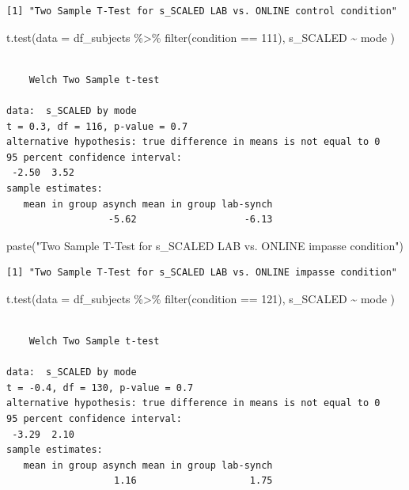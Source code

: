 \documentclass[
  letterpaper,
  DIV=11,
  numbers=noendperiod]{scrreprt}
\newenvironment{Shaded}{\begin{snugshade}}{\end{snugshade}}
\newcommand{\AttributeTok}[1]{\textcolor[rgb]{0.40,0.45,0.13}{#1}}
\newcommand{\DecValTok}[1]{\textcolor[rgb]{0.68,0.00,0.00}{#1}}
\newcommand{\FunctionTok}[1]{\textcolor[rgb]{0.28,0.35,0.67}{#1}}
\newcommand{\NormalTok}[1]{\textcolor[rgb]{0.00,0.23,0.31}{#1}}
\newcommand{\SpecialCharTok}[1]{\textcolor[rgb]{0.37,0.37,0.37}{#1}}
\newcommand{\StringTok}[1]{\textcolor[rgb]{0.13,0.47,0.30}{#1}}
\begin{document}
\begin{verbatim}
[1] "Two Sample T-Test for s_SCALED LAB vs. ONLINE control condition"
\end{verbatim}

\begin{Shaded}
\begin{Highlighting}[]
\FunctionTok{t.test}\NormalTok{(}\AttributeTok{data =}\NormalTok{ df\_subjects }\SpecialCharTok{\%\textgreater{}\%} \FunctionTok{filter}\NormalTok{(condition }\SpecialCharTok{==} \DecValTok{111}\NormalTok{), s\_SCALED }\SpecialCharTok{\textasciitilde{}}\NormalTok{ mode )}
\end{Highlighting}
\end{Shaded}

\begin{verbatim}

    Welch Two Sample t-test

data:  s_SCALED by mode
t = 0.3, df = 116, p-value = 0.7
alternative hypothesis: true difference in means is not equal to 0
95 percent confidence interval:
 -2.50  3.52
sample estimates:
   mean in group asynch mean in group lab-synch 
                  -5.62                   -6.13 
\end{verbatim}

\begin{Shaded}
\begin{Highlighting}[]
\FunctionTok{paste}\NormalTok{(}\StringTok{"Two Sample T{-}Test for s\_SCALED LAB vs. ONLINE impasse condition"}\NormalTok{)}
\end{Highlighting}
\end{Shaded}

\begin{verbatim}
[1] "Two Sample T-Test for s_SCALED LAB vs. ONLINE impasse condition"
\end{verbatim}

\begin{Shaded}
\begin{Highlighting}[]
\FunctionTok{t.test}\NormalTok{(}\AttributeTok{data =}\NormalTok{ df\_subjects }\SpecialCharTok{\%\textgreater{}\%} \FunctionTok{filter}\NormalTok{(condition }\SpecialCharTok{==} \DecValTok{121}\NormalTok{), s\_SCALED }\SpecialCharTok{\textasciitilde{}}\NormalTok{ mode )}
\end{Highlighting}
\end{Shaded}

\begin{verbatim}

    Welch Two Sample t-test

data:  s_SCALED by mode
t = -0.4, df = 130, p-value = 0.7
alternative hypothesis: true difference in means is not equal to 0
95 percent confidence interval:
 -3.29  2.10
sample estimates:
   mean in group asynch mean in group lab-synch 
                   1.16                    1.75 
\end{verbatim}
\end{document}
